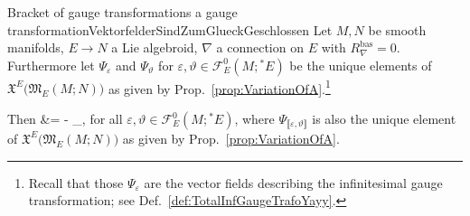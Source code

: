 \documentclass[a4paper,oneside,11pt,leqno]{scrartcl} %
\def\ba#1\ea{\begin{align}#1\end{align}}
\theoremstyle{plain}
\theoremstyle{remark}
\theoremstyle{definition}
\begin{document}
\begin{theorems}{Bracket of gauge transformations a gauge transformation}{VektorfelderSindZumGlueckGeschlossen}
Let $M, N$ be smooth manifolds, $E \to N$ a Lie algebroid, $\nabla$ a connection on $E$ with $R^{\mathrm{bas}}_\nabla=0$. Furthermore let $\Psi_\varepsilon$ and $\Psi_\vartheta$ for $\varepsilon, \vartheta \in \mathcal{F}^0_E(M; {}^*E)$ be the unique elements of $\mathfrak{X}^E\bigl( \mathfrak{M}_E(M;N) \bigr)$ as given by Prop.~\ref{prop:VariationOfA}.\footnote{Recall that those $\Psi_\varepsilon$ are the vector fields describing the infinitesimal gauge transformation; see Def.~\ref{def:TotalInfGaugeTrafoYayy}.}

Then
\ba
\mleft[ \Psi_\varepsilon, \Psi_\vartheta \mright]
&=
- \Psi_{\llbracket\varepsilon, \vartheta \rrbracket}
\ea
for all $\varepsilon, \vartheta \in \mathcal{F}^0_E(M; {}^*E)$, where $\Psi_{\llbracket\varepsilon, \vartheta\rrbracket}$ is also the unique element of $\mathfrak{X}^E\bigl( \mathfrak{M}_E(M;N) \bigr)$ as given by Prop.~\ref{prop:VariationOfA}.
\end{theorems}
\end{document}
